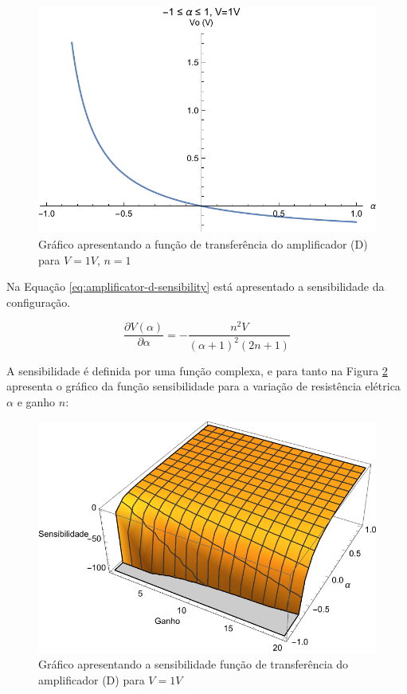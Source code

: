 \documentclass[a4paper]{instrumentacao}
\begin{document}
\begin{figure}[H]
\center
\includegraphics[width=\textwidth]{Amplificador-D-TF.pdf}
\caption{Gráfico apresentando a função de transferência do amplificador (D) para $V=1V$, $n=1$}
\label{fig:amplificador-d-tf}
\end{figure}

Na Equação \ref{eq:amplificator-d-sensibility} está apresentado a sensibilidade da configuração.

\begin{equation}
	\frac{\partial V(\alpha)}{\partial \alpha} = -\frac{n^2 V}{(\alpha +1)^2 (2 n+1)}
	\label{eq:amplificator-d-sensibility}
\end{equation}

A sensibilidade é definida por uma função complexa, e para tanto na Figura  \ref{fig:amplificador-d-sensibilidade} apresenta o gráfico da função sensibilidade para a variação de resistência elétrica $\alpha$ e ganho $n$:

\begin{figure}[H]
\center
\includegraphics[width=\textwidth]{Amplificador-D-Sensibility.pdf}
\caption{Gráfico apresentando a sensibilidade função de transferência do amplificador (D) para $V=1V$}
\label{fig:amplificador-d-sensibilidade}
\end{figure}
\end{document}
